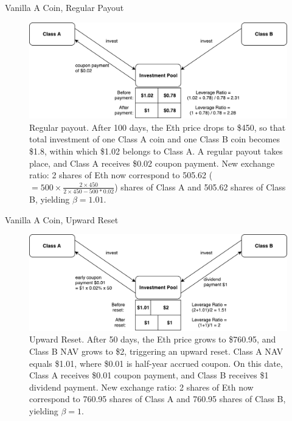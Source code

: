 \documentclass[notes=show, beamer, handout]{beamer}
\begin{document}
\begin{frame}{Vanilla A Coin, Regular Payout}
\begin{figure}
\includegraphics[width=\textwidth]{periodic.pdf}
\caption{\footnotesize Regular payout. After 100 days, the Eth price drops to \$450, so that total investment of one Class A coin and one Class B coin becomes \$1.8, within which \$1.02 belongs to Class A. A regular payout takes place, and Class A receives \$0.02 coupon payment. New exchange ratio: 2 shares of Eth now correspond to 505.62 ($=500\times\frac{2\times450}{2\times450-500*0.02}$) shares of Class A and 505.62 shares of Class B, yielding $\beta=1.01$. }
\end{figure}
\end{frame}


\begin{frame}{Vanilla A Coin, Upward Reset}

\begin{figure}
\includegraphics[width=\textwidth]{upward.pdf}
\caption{\footnotesize Upward Reset. After 50 days, the Eth price grows to \$760.95, and Class B NAV grows to \$2, triggering an upward reset. Class A NAV equals \$1.01, where \$0.01 is half-year accrued coupon. On this date, Class A receives \$0.01 coupon payment, and Class B receives \$1 dividend payment. New exchange ratio: 2 shares of Eth now correspond to 760.95 shares of Class A and 760.95 shares of Class B, yielding $\beta=1$. }
\end{figure}

\end{frame}
\end{document}
